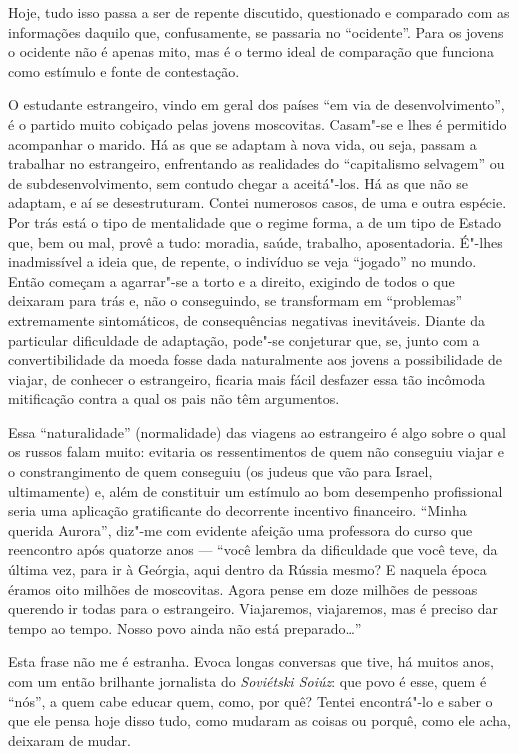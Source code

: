 Hoje, tudo isso passa a ser de repente discutido, questionado e
comparado com as informações daquilo que, confusamente, se passaria no
``ocidente''. Para os jovens o ocidente não é apenas mito, mas é o termo
ideal de comparação que funciona como estímulo e fonte de contestação.

O estudante estrangeiro, vindo em geral dos países ``em via de
desenvolvimento'', é o partido muito cobiçado pelas jovens moscovitas.
Casam"-se e lhes é permitido acompanhar o marido. Há as que se adaptam à
nova vida, ou seja, passam a trabalhar no estrangeiro, enfrentando as
realidades do ``capitalismo selvagem'' ou de subdesenvolvimento, sem
contudo chegar a aceitá"-los. Há as que não se adaptam, e aí se
desestruturam. Contei numerosos casos, de uma e outra espécie. Por trás
está o tipo de mentalidade que o regime forma, a de um tipo de Estado
que, bem ou mal, provê a tudo: moradia, saúde, trabalho, aposentadoria.
É"-lhes inadmissível a ideia que, de repente, o indivíduo se veja
``jogado'' no mundo. Então começam a agarrar"-se a torto e a direito,
exigindo de todos o que deixaram para trás e, não o conseguindo, se
transformam em ``problemas'' extremamente sintomáticos, de consequências
negativas inevitáveis. Diante da particular dificuldade de adaptação,
pode"-se conjeturar que, se, junto com a convertibilidade da moeda fosse
dada naturalmente aos jovens a possibilidade de viajar, de conhecer o
estrangeiro, ficaria mais fácil desfazer essa tão incômoda mitificação
contra a qual os pais não têm argumentos.

Essa ``naturalidade'' (normalidade) das viagens ao estrangeiro é algo
sobre o qual os russos falam muito: evitaria os ressentimentos de quem
não conseguiu viajar e o constrangimento de quem conseguiu (os judeus
que vão para Israel, ultimamente) e, além de constituir um estímulo ao
bom desempenho profissional seria uma aplicação gratificante do
decorrente incentivo financeiro. ``Minha querida Aurora'', diz"-me com
evidente afeição uma professora do curso que reencontro após quatorze
anos --- ``você lembra da dificuldade que você teve, da última vez, para ir
à Geórgia, aqui dentro da Rússia mesmo? E naquela época éramos oito
milhões de moscovitas. Agora pense em doze milhões de pessoas querendo
ir todas para o estrangeiro. Viajaremos, viajaremos, mas é preciso dar
tempo ao tempo. Nosso povo ainda não está preparado\ldots{}''

Esta frase não me é estranha. Evoca longas conversas que tive, há muitos
anos, com um então brilhante jornalista do \emph{Soviétski Soiúz}: que
povo é esse, quem é ``nós'', a quem cabe educar quem, como, por quê?
Tentei encontrá"-lo e saber o que ele pensa hoje disso tudo, como mudaram
as coisas ou porquê, como ele acha, deixaram de mudar.

